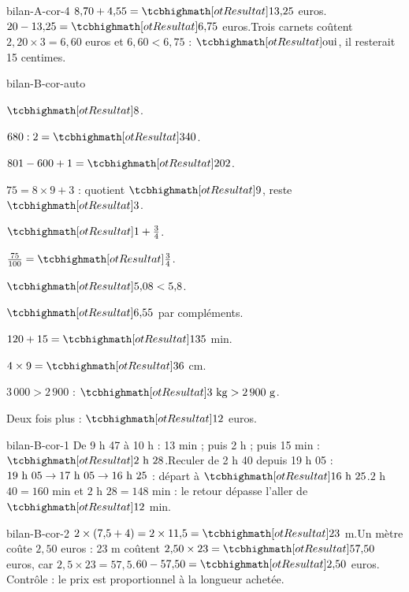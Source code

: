 \begin{blocEdition}{bilan-A-cor-4}
$8{,}70+4{,}55=\res{13{,}25}$ euros.$20-13{,}25=\res{6{,}75}$ euros.Trois carnets coûtent $2{,}20\times3=6{,}60$ euros et $6{,}60<6{,}75$ : $\res{\text{oui}}$, il resterait 15 centimes.
\end{blocEdition}
\begin{blocEdition}{bilan-B-cor-auto}
\begin{questions}
\item $\res8$.
\item $680:2=\res{340}$.
\item $801-600+1=\res{202}$.
\item $75=8\times9+3$ : quotient $\res9$, reste $\res3$.
\item $\res{1+\frac34}$.
\item $\frac{75}{100}=\res{\frac34}$.
\item $\res{5{,}08<5{,}8}$.
\item $\res{6{,}55}$ par compléments.
\item $120+15=\res{135}$ min.
\item $4\times9=\res{36}$ cm.
\item $3\,000>2\,900$ : $\res{3\ \mathrm{kg}>2\,900\ \mathrm g}$.
\item Deux fois plus : $\res{12}$ euros.\end{questions}
\end{blocEdition}
\begin{blocEdition}{bilan-B-cor-1}
De 9 h 47 à 10 h : 13 min ; puis 2 h ; puis 15 min : $\res{2\ \text h\ 28}$.Reculer de 2 h 40 depuis 19 h 05 : $19\ \text h\ 05\to17\ \text h\ 05\to16\ \text h\ 25$ : départ à $\res{16\ \text h\ 25}$.$2$ h $40=160$ min et $2$ h $28=148$ min : le retour dépasse l’aller de $\res{12}$ min.
\end{blocEdition}
\begin{blocEdition}{bilan-B-cor-2}
$2\times(7{,}5+4)=2\times11{,}5=\res{23}$ m.Un mètre coûte $2{,}50$ euros : 23 m coûtent $2{,}50\times23=\res{57{,}50}$ euros, car $2{,}5\times23=57{,}5$.$60-57{,}50=\res{2{,}50}$ euros. Contrôle : le prix est proportionnel à la longueur achetée.
\end{blocEdition}
